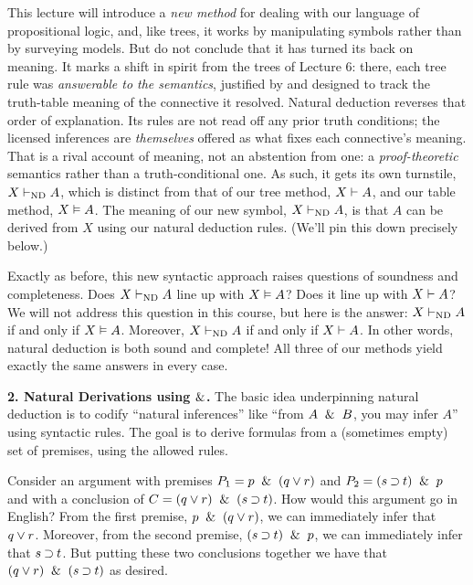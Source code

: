 \documentclass[options]{philosophersimprint}
\begin{document}
This lecture will introduce a \textit{new method} for dealing with our language of propositional logic, and, like trees, it works by manipulating symbols rather than by surveying models. But do not conclude that it has turned its back on meaning. It marks a shift in spirit from the trees of Lecture 6: there, each tree rule was \textit{answerable to the semantics}, justified by and designed to track the truth-table meaning of the connective it resolved. Natural deduction reverses that order of explanation. Its rules are not read off any prior truth conditions; the licensed inferences are \textit{themselves} offered as what fixes each connective's meaning. That is a rival account of meaning, not an abstention from one: a \textit{proof-theoretic} semantics rather than a truth-conditional one. As such, it gets its own turnstile, $X \vdash_{\mathrm{ND}} A$, which is distinct from that of our tree method, $X \vdash A$, and our table method, $X \vDash A$. The meaning of our new symbol, $X \vdash_{\mathrm{ND}} A$, is that $A$ can be derived from $X$ using our natural deduction rules. (We'll pin this down precisely below.)

Exactly as before, this new syntactic approach raises questions of soundness and completeness.  Does $X \vdash_{\mathrm{ND}} A$ line up with $X \vDash A$? Does it line up with $X \vdash A$? We will not address this question in this course, but here is the answer: $X \vdash_{\mathrm{ND}} A$ if and only if $X \vDash A$. Moreover, $X \vdash_{\mathrm{ND}} A$ if and only if $X \vdash A$. In other words, natural deduction is both sound and complete! All three of our methods yield exactly the same answers in every case.

\textbf{2. Natural Derivations using $\mathbin{\&}$.} The basic idea underpinning natural deduction is to codify ``natural inferences'' like ``from $A \ \mathbin{\&} \  B$, you may infer $A$'' using syntactic rules. The goal is to derive formulas from a (sometimes empty) set of premises, using the allowed rules.

Consider an argument with premises $P_1 = p \ \mathbin{\&} \  (q \mathbin{\vee} r)$ and $P_2 = (s \mathbin{\supset} t)\ \mathbin{\&} \  p$ and with a conclusion of $C=(q \mathbin{\vee} r) \ \mathbin{\&} \  (s \mathbin{\supset} t)$. How would this argument go in English? From the first premise, $p \ \mathbin{\&} \  (q \mathbin{\vee} r)$, we can immediately infer that $q \mathbin{\vee} r$. Moreover, from the second premise, $(s \mathbin{\supset} t)\ \mathbin{\&} \  p$, we can immediately infer that $s \mathbin{\supset} t$. But putting these two conclusions together we have that $(q \mathbin{\vee} r) \ \mathbin{\&} \  (s \mathbin{\supset} t)$ as desired.
\end{document}
